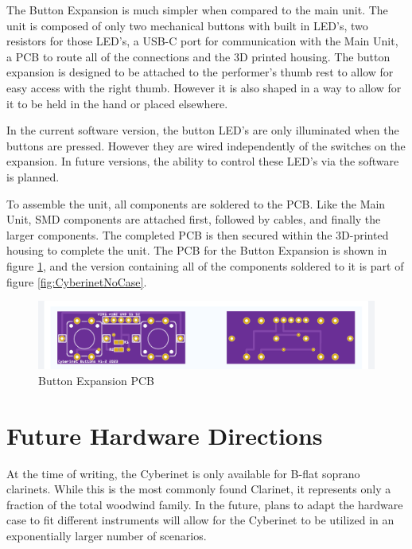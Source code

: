 The Button Expansion is much simpler when compared to the main unit. The unit is composed of only two mechanical buttons with built in LED's, two resistors for those LED's, a USB-C port for communication with the Main Unit, a PCB to route all of the connections and the 3D printed housing. The button expansion is designed to be attached to the performer's thumb rest to allow for easy access with the right thumb. However it is also shaped in a way to allow for it to be held in the hand or placed elsewhere.

In the current software version, the button LED's are only illuminated when the buttons are pressed. However they are wired independently of the switches on the expansion. In future versions, the ability to control these LED's via the software is planned.

To assemble the unit, all components are soldered to the PCB. Like the Main Unit, SMD components are attached first, followed by cables, and finally the larger components. The completed PCB is then secured within the 3D-printed housing to complete the unit. The PCB for the Button Expansion is shown in figure \ref{fig:buttonPCB}, and the version containing all of the components soldered to it is part of figure \ref{fig:CyberinetNoCase}.


\begin{center}
    \begin{figure}
        \centering
        \includegraphics[scale=0.5]{diagrams/PCBs/buttons1.2.png}
        \caption{Button Expansion PCB}
        \label{fig:buttonPCB}
    \end{figure}
\end{center}


\section{Future Hardware Directions}
At the time of writing, the Cyberinet is only available for B-flat soprano clarinets. While this is the most commonly found Clarinet, it represents only a fraction of the total woodwind family. In the future, plans to adapt the hardware case to fit different instruments will allow for the Cyberinet to be utilized in an exponentially larger number of scenarios. 

